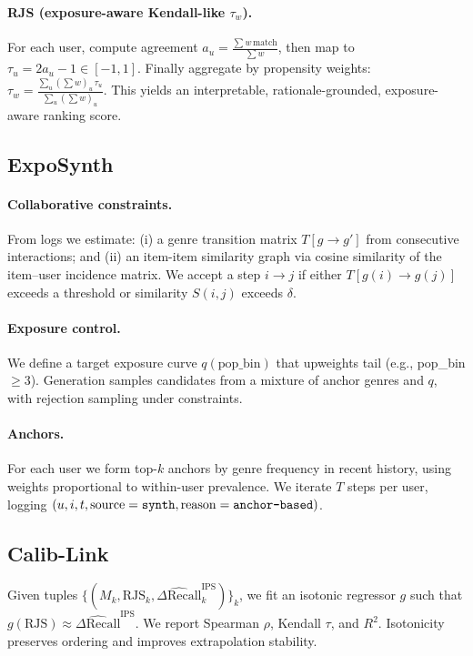\documentclass[10pt]{article}
\begin{document}
\paragraph{RJS (exposure-aware Kendall-like \(\tau_w\)).} For each user, compute agreement \(a_u = \frac{\sum w\,\mathrm{match}}{\sum w}\), then map to \(\tau_u = 2a_u - 1\in[-1,1]\). Finally aggregate by propensity weights: \(\tau_w = \frac{\sum_u (\sum w)_u\,\tau_u}{\sum_u (\sum w)_u}\). This yields an interpretable, rationale-grounded, exposure-aware ranking score.

\subsection{ExpoSynth}
\label{sec:exposynth}
\paragraph{Collaborative constraints.} From logs we estimate: (i) a genre transition matrix \(T[g\to g']\) from consecutive interactions; and (ii) an item-item similarity graph via cosine similarity of the item–user incidence matrix. We accept a step \(i\to j\) if either \(T[g(i)\to g(j)]\) exceeds a threshold or similarity \(S(i,j)\) exceeds \(\delta\).

\paragraph{Exposure control.} We define a target exposure curve \(q(\mathrm{pop\_bin})\) that upweights tail (e.g., pop\_bin\(\ge 3\)). Generation samples candidates from a mixture of anchor genres and \(q\), with rejection sampling under constraints.

\paragraph{Anchors.} For each user we form top-\(k\) anchors by genre frequency in recent history, using weights proportional to within-user prevalence. We iterate \(T\) steps per user, logging \((u,i,t,\mathrm{source}=\text{\tt synth}, \mathrm{reason}=\text{\tt anchor\mbox{-}based})\).

\subsection{Calib-Link}
\label{sec:calib}
Given tuples \(\{(M_k, \mathrm{RJS}_k, \widehat{\Delta \mathrm{Recall}}^{\mathrm{IPS}}_{k})\}_k\), we fit an isotonic regressor \(g\) such that \(g(\mathrm{RJS})\approx \widehat{\Delta \mathrm{Recall}}^{\mathrm{IPS}}\). We report Spearman \(\rho\), Kendall \(\tau\), and \(R^2\). Isotonicity preserves ordering and improves extrapolation stability.
\end{document}
